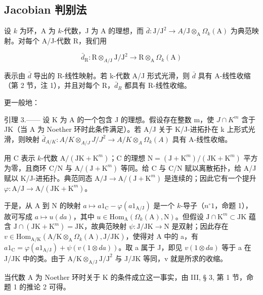 \subsection{Jacobian 判别法}

设 \(k\) 为环，A 为 \(k\)-代数，J 为 A 的理想，而 \(\bar{d}:\mathrm{J / J^{2}}\to A /\mathrm{J}\otimes_{\mathrm{A}}\Omega_{k}(\mathrm{A})\) 为典范映射。对每个 A/J-代数 R，我们用

\[
\bar {d} _ {\mathrm{R}}: \mathrm{R} \otimes_ {A / \mathrm{J}} \mathrm{J} / \mathrm{J} ^ {2} \longrightarrow \mathrm{R} \otimes_ {\mathrm{A}} \Omega_ {k} (\mathrm{A})
\]

表示由 \(\bar{d}\) 导出的 R-线性映射。若 k-代数 A/J 形式光滑，则 \(\bar{d}\) 具有 A-线性收缩（第 2 节，注 1），并且对每个 R，\(\bar{d}_{R}\) 都具有 R-线性收缩。

更一般地：

引理 3.—— 设 K 为 A 的一个包含 J 的理想。假设存在整数 m，使 \(J \cap K^{m}\) 含于 JK（当 A 为 Noether 环时此条件满足）。若 A/J 关于 K/J-进拓扑在 k 上形式光滑，则映射 \(\bar{d}_{A/K}: A/K \otimes_{A/J} J/J^{2} \longrightarrow A/K \otimes_{A} \Omega_{k}(A)\) 具有 A-线性收缩。

用 C 表示 \(k\)-代数 \(\mathrm{A} / (\mathrm{JK} + \mathrm{K}^m)\)；C 的理想 \(\mathrm{N} = (\mathrm{J} + \mathrm{K}^m) / (\mathrm{JK} + \mathrm{K}^m)\) 平方为零，且商环 C/N 与 \(\mathrm{A} / (\mathrm{J} + \mathrm{K}^m)\) 等同。给 C 与 C/N 赋以离散拓扑，给 A/J 赋以 K/J-进拓扑。典范同态 \(\mathrm{A} / \mathrm{J} \to \mathrm{A} / (\mathrm{J} + \mathrm{K}^m)\) 是连续的；因此它有一个提升 \(\varphi : \mathrm{A} / \mathrm{J} \to \mathrm{A} / (\mathrm{JK} + \mathrm{K}^m)\)。

于是，从 A 到 N 的映射 \(a \mapsto a1_{\mathrm{C}} - \varphi(a1_{\mathrm{A/J}})\) 是一个 \(k\)-导子（\(n^{\circ} 1\)，命题 1），故可写成 \(a \mapsto u(da)\)，其中 \(u \in \mathrm{Hom}_{\mathrm{A}}(\Omega_k(\mathrm{A}), \mathrm{N})\)。但假设 \(\mathrm{J} \cap \mathrm{K}^m \subset \mathrm{JK}\) 蕴含 \(\mathrm{J} \cap (\mathrm{JK} + \mathrm{K}^m) = \mathrm{JK}\)，故典范映射 \(\psi: \mathrm{J/JK} \to \mathrm{N}\) 是双射；因此存在 \(v \in \mathrm{Hom}_{\mathrm{A/K}}(\mathrm{A/K} \otimes_{\mathrm{A}} \Omega_k(\mathrm{A}), \mathrm{J/JK})\)，使得对 A 中的 a，有 \(a1_{\mathrm{C}} = \varphi(a1_{\mathrm{A/J}}) + \psi(v(1 \otimes da))\)。取 a 属于 J，即见 \(v(1 \otimes da)\) 等于 a 在 J/JK 中的类。由于 \(\mathrm{A/K} \otimes_{\mathrm{A/J}} \mathrm{J/J}^2\) 与 J/JK 等同，v 就是所求的收缩。

当代数 A 为 Noether 环时关于 K 的条件成立这一事实，由 III, § 3, 第 1 节，命题 1 的推论 2 可得。

